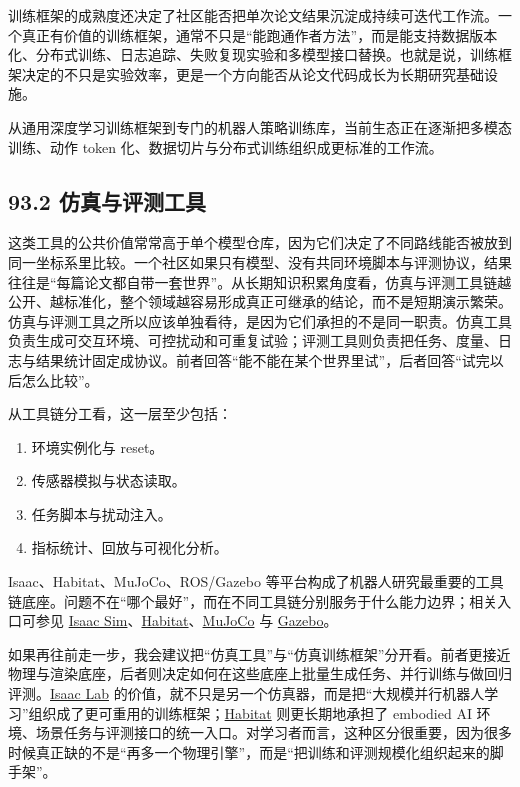 训练框架的成熟度还决定了社区能否把单次论文结果沉淀成持续可迭代工作流。一个真正有价值的训练框架，通常不只是“能跑通作者方法”，而是能支持数据版本化、分布式训练、日志追踪、失败复现实验和多模型接口替换。也就是说，训练框架决定的不只是实验效率，更是一个方向能否从论文代码成长为长期研究基础设施。

从通用深度学习训练框架到专门的机器人策略训练库，当前生态正在逐渐把多模态训练、动作 token 化、数据切片与分布式训练组织成更标准的工作流。

\subsection*{93.2 仿真与评测工具}


这类工具的公共价值常常高于单个模型仓库，因为它们决定了不同路线能否被放到同一坐标系里比较。一个社区如果只有模型、没有共同环境脚本与评测协议，结果往往是“每篇论文都自带一套世界”。从长期知识积累角度看，仿真与评测工具链越公开、越标准化，整个领域越容易形成真正可继承的结论，而不是短期演示繁荣。 仿真与评测工具之所以应该单独看待，是因为它们承担的不是同一职责。仿真工具负责生成可交互环境、可控扰动和可重复试验；评测工具则负责把任务、度量、日志与结果统计固定成协议。前者回答“能不能在某个世界里试”，后者回答“试完以后怎么比较”。

从工具链分工看，这一层至少包括：

\begin{enumerate}
\item 环境实例化与 reset。
\item 传感器模拟与状态读取。
\item 任务脚本与扰动注入。
\item 指标统计、回放与可视化分析。
\end{enumerate}

Isaac、Habitat、MuJoCo、ROS/Gazebo 等平台构成了机器人研究最重要的工具链底座。问题不在“哪个最好”，而在不同工具链分别服务于什么能力边界；相关入口可参见 \href{https://developer.nvidia.com/isaac/sim}{Isaac Sim}、\href{https://aihabitat.org/}{Habitat}、\href{https://mujoco.org/}{MuJoCo} 与 \href{https://gazebosim.org/home}{Gazebo}。

如果再往前走一步，我会建议把“仿真工具”与“仿真训练框架”分开看。前者更接近物理与渲染底座，后者则决定如何在这些底座上批量生成任务、并行训练与做回归评测。\href{https://github.com/isaac-sim/IsaacLab}{Isaac Lab} 的价值，就不只是另一个仿真器，而是把“大规模并行机器人学习”组织成了更可重用的训练框架；\href{https://aihabitat.org/}{Habitat} 则更长期地承担了 embodied AI 环境、场景任务与评测接口的统一入口。对学习者而言，这种区分很重要，因为很多时候真正缺的不是“再多一个物理引擎”，而是“把训练和评测规模化组织起来的脚手架”。

